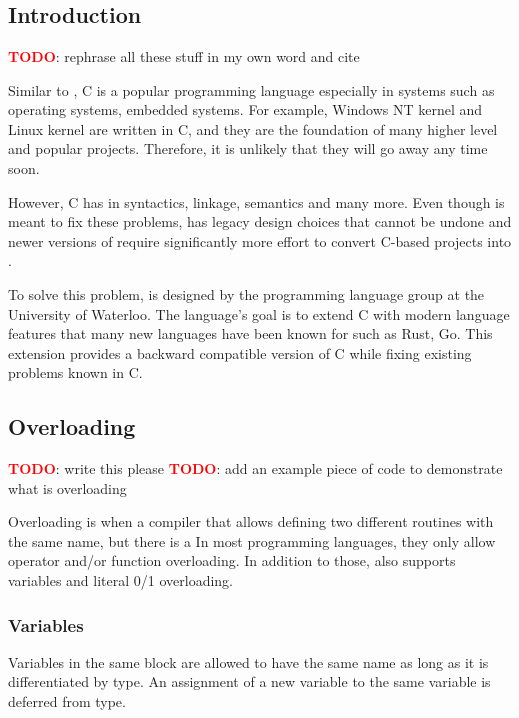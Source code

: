 \chapter{\CFA} \label{CFA}
\section{Introduction}
\textbf{\textcolor{red}{TODO}}: rephrase all these stuff in my own word and cite

Similar to \CC, C is a popular programming language especially in systems such
as operating systems, embedded systems. For example, Windows NT kernel and
Linux kernel are written in C, and they are the foundation of many higher level
and popular projects. Therefore, it is unlikely that they will go away any time soon.

However, C has in syntactics, linkage, semantics and many
more. Even though \CCS is meant to fix these problems, \CCS has legacy design
choices that cannot be undone and newer versions of \CCS require significantly
more effort to convert C-based projects into \CCS.

To solve this problem, \CFAS is designed by the programming language group at the
University of Waterloo. The language's goal is to extend C with modern language
features that many new languages have been known for such as Rust, Go. This
extension provides a backward compatible version of C while fixing existing
problems known in C.

\section{Overloading}
\textbf{\textcolor{red}{TODO}}: write this please
\textbf{\textcolor{red}{TODO}}: add an example piece of code to demonstrate what
is overloading

Overloading is when a compiler that allows defining two different routines with
the same name, but there is a
In most programming languages, they only allow operator and/or function overloading.
In addition to those, \uCPP also supports variables and literal 0/1 overloading.

\subsection{Variables}
Variables in the same block are allowed to have the same name as long as it is
differentiated by type. An assignment of a new variable to the same variable is
deferred from type.

